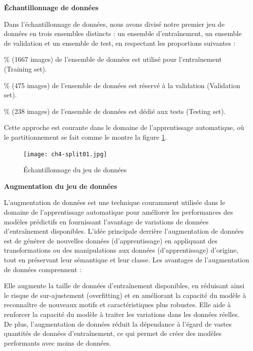 
\textbf{Échantillonnage de données}
\par Dans l'échantillonnage de données, nous avons divisé notre premier jeu de données en trois ensembles distincts : un ensemble d'entraînement, un ensemble de validation et un ensemble de test, en respectant les proportions suivantes :

\begin{outline}

\% (1667 images) de l'ensemble de données est utilisé pour l'entraînement (Training set).

\% (475 images) de l'ensemble de données est réservé à la validation (Validation set).

\% (238 images) de l'ensemble de données est dédié aux tests (Testing set).

\end{outline}

Cette approche est courante dans le domaine de l'apprentissage automatique, où le partitionnement se fait comme le montre la figure \ref{fig:split_dataset_car}.

\begin{figure}[H]
	\centering
	\texttt{[image: ch4-split01.jpg]}
	\caption{Échantillonnage du jeu de données}
    \label{fig:split_dataset_car}
\end{figure}


\textbf{Augmentation du jeu de données}

L'augmentation de données est une technique couramment utilisée dans le domaine de l'apprentissage automatique pour améliorer les performances des modèles prédictifs en fournissant l'avantage de variations de données d'entraînement disponibles. L'idée principale derrière l'augmentation de données est de générer de nouvelles données (d'apprentissage) en appliquant des transformations ou des manipulations aux données (d'apprentissage) d'origine, tout en préservant leur sémantique et leur classe.
Les avantages de l'augmentation de données comprennent :

\begin{outline}
\1 Elle augmente la taille de données d'entraînement disponibles, en réduisant ainsi le risque de sur-ajustement (overfitting) et en améliorant la capacité du modèle à reconnaître de nouveaux motifs et caractéristiques plus robustes.
\1 Elle aide à renforcer la capacité du modèle à traiter les variations dans les données réelles.
\1 De plus, l'augmentation de données réduit la dépendance à l'égard de vastes quantités de données d'entraînement, ce qui permet de créer des modèles performants avec moins de données.
\end{outline}

